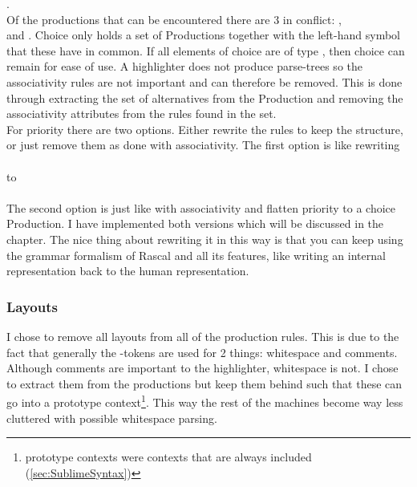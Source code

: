 .\\
Of the productions that can be encountered there are 3 in conflict: ,\\  and . Choice only holds a set of Productions together with the left-hand symbol that these have in common. If all elements of choice are of type , then choice can remain for ease of use. A highlighter does not produce parse-trees so the associativity rules are not important and can therefore be removed. This is done through extracting the set of alternatives from the Production and removing the associativity attributes from the rules found in the set.\\
For priority there are two options. Either rewrite the rules to keep the structure, or just remove them as done with associativity. The first option is like rewriting\\
\\
to\\
\\
The second option is just like with associativity and flatten priority to a choice Production. I have implemented both versions which will be discussed in the  chapter. The nice thing about rewriting it in this way is that you can keep using the grammar formalism of Rascal and all its features, like writing an internal representation back to the human representation.

\subsubsection{Layouts}
I chose to remove all layouts from all of the production rules. This is due to the fact that generally the -tokens are used for 2 things: whitespace and comments. Although comments are important to the highlighter, whitespace is not. I chose to extract them from the productions but keep them behind such that these can go into a prototype context\footnote{prototype contexts were contexts that are always included (\ref{sec:SublimeSyntax})}. This way the rest of the machines become way less cluttered with possible whitespace parsing.

